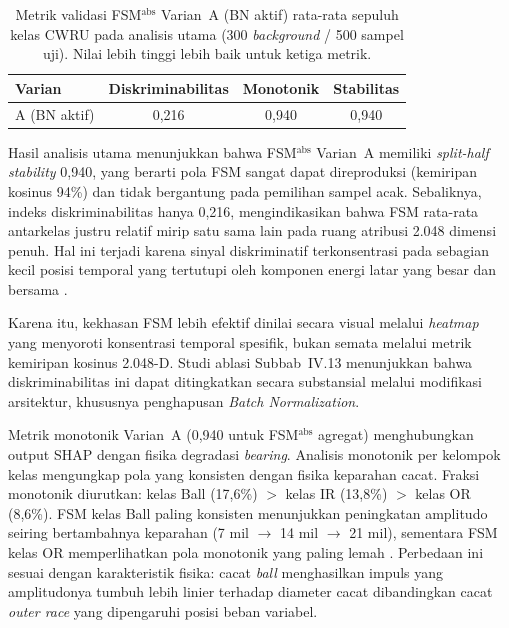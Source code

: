 \begin{table}[ht]
\caption{{\color{blue}Metrik validasi FSM$^{\text{abs}}$ Varian~A
         (BN aktif) rata-rata sepuluh kelas CWRU pada analisis utama
         (300 \emph{background} / 500 sampel uji).}
         Nilai lebih tinggi lebih baik untuk ketiga metrik.}
\label{tab:bab4_validasi_fsm}
\centering
\begin{tabular}{lccc}
\toprule
\textbf{Varian} & \textbf{Diskriminabilitas} & \textbf{Monotonik} & \textbf{Stabilitas}\\
\midrule
{\color{blue}A (BN aktif)} & {\color{blue}0,216} & {\color{blue}0,940} & {\color{blue}0,940}\\
\bottomrule
\end{tabular}
\end{table}

{\color{blue}Hasil analisis utama menunjukkan bahwa FSM$^{\text{abs}}$
Varian~A memiliki \emph{split-half stability} 0,940, yang berarti pola FSM
sangat dapat direproduksi (kemiripan kosinus 94\%) dan tidak bergantung pada
pemilihan sampel acak.} Sebaliknya, indeks diskriminabilitas hanya 0,216,
mengindikasikan bahwa {\color{blue}FSM rata-rata antarkelas justru relatif
mirip satu sama lain pada ruang atribusi 2.048 dimensi penuh. Hal ini terjadi
karena sinyal diskriminatif terkonsentrasi pada sebagian kecil posisi temporal
yang tertutupi oleh komponen energi latar yang besar dan bersama
.}

{\color{blue}Karena itu, kekhasan FSM lebih efektif dinilai secara visual
melalui \emph{heatmap} yang menyoroti konsentrasi temporal spesifik, bukan
semata melalui metrik kemiripan kosinus 2.048-D. Studi ablasi Subbab~IV.13
menunjukkan bahwa diskriminabilitas ini dapat ditingkatkan secara substansial
melalui modifikasi arsitektur, khususnya penghapusan \emph{Batch
Normalization}.}

Metrik monotonik {\color{blue}Varian~A (0,940 untuk FSM$^{\text{abs}}$
agregat)} menghubungkan output SHAP dengan fisika degradasi \emph{bearing}.
{\color{blue}Analisis monotonik per kelompok kelas mengungkap pola yang
konsisten dengan fisika keparahan cacat.}
Fraksi monotonik diurutkan: kelas Ball (17,6\%) $>$ kelas IR (13,8\%) $>$
kelas OR (8,6\%).
FSM kelas Ball paling konsisten menunjukkan peningkatan amplitudo seiring
bertambahnya keparahan (7 mil $\to$ 14 mil $\to$ 21 mil), sementara FSM kelas OR
memperlihatkan pola monotonik yang paling lemah
.
Perbedaan ini sesuai dengan karakteristik fisika: cacat \emph{ball}
menghasilkan impuls yang amplitudonya tumbuh lebih linier terhadap diameter
cacat dibandingkan cacat \emph{outer race} yang dipengaruhi posisi beban
variabel.


